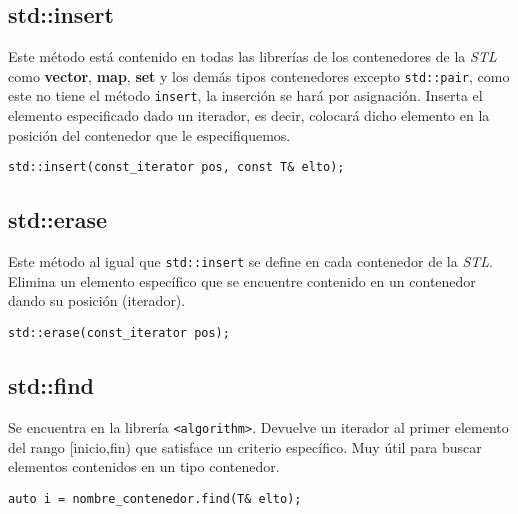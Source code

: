 \subsection{std::insert}
Este método está contenido en todas las librerías de los contenedores de la \textit{STL} como \textbf{vector}, \textbf{map}, \textbf{set} y los demás tipos contenedores excepto \texttt{std::pair}, como este no tiene el método \texttt{insert}, la inserción se hará por asignación.
Inserta el elemento especificado dado un iterador, es decir, colocará dicho elemento en la posición del contenedor que le especifiquemos.
\begin{center}
	\texttt{std::insert(const\_iterator pos, const T\& elto);}
\end{center}

\subsection{std::erase}
Este método al igual que \texttt{std::insert} se define en cada contenedor de la \textit{STL}.
Elimina un elemento específico que se encuentre contenido en un contenedor dando su posición (iterador).
\begin{center}
	\texttt{std::erase(const\_iterator pos);}
\end{center}

\subsection{std::find}
Se encuentra en la librería \texttt{\textless algorithm\textgreater}.
Devuelve un iterador al primer elemento del rango [inicio,fin) que satisface un criterio específico.
Muy útil para buscar elementos contenidos en un tipo contenedor.
\begin{center}
	\texttt{auto i = nombre\_contenedor.find(T\& elto);}
\end{center}